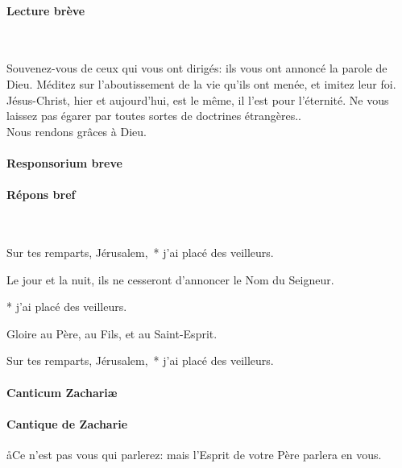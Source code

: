 \documentclass[twoside]{article}
\begin{document}
\begin{paracol}[1]{2}
\paragraph{Lecture brève}

~~

 \capsaut Souvenez-vous de ceux qui vous ont dirigés: ils vous ont annoncé
la parole de Dieu. Méditez sur l’aboutissement de la vie qu’ils ont
menée, et imitez leur foi. Jésus-Christ, hier et aujourd’hui, est le
même, il l’est pour l’éternité. Ne vous laissez pas égarer par toutes
sortes de doctrines étrangères..\\
\rr Nous rendons grâces à Dieu.

\vspace{2cm}

\switchcolumn*

\paragraph{Responsorium breve}

\switchcolumn

\paragraph{Répons bref}

~~

\rr Sur tes remparts, Jérusalem,~* j’ai placé des veilleurs.

\vv Le jour et la nuit, ils ne cesseront d’annoncer le Nom du Seigneur.

* j’ai placé des veilleurs.

\vv Gloire au Père, au Fils, et au Saint-Esprit.

\rr Sur tes remparts, Jérusalem,~* j’ai placé des veilleurs.

\newpage

\switchcolumn*

\paragraph{Canticum Zachariæ}


\switchcolumn

\paragraph{Cantique de Zacharie}

\aa Ce n’est pas vous qui parlerez: mais l’Esprit de votre Père parlera en vous.


\end{paracol}
\end{document}

